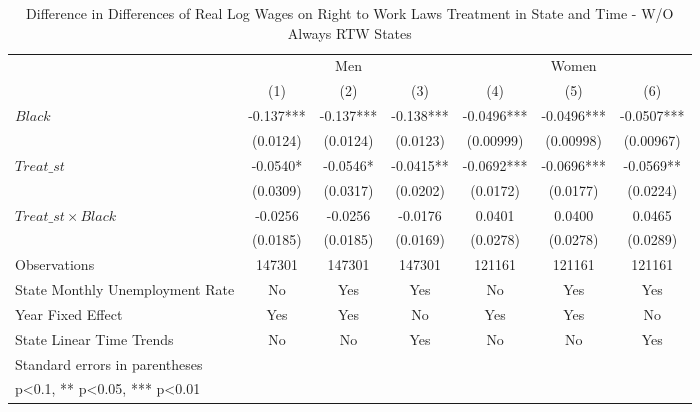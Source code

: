 \begin{table}[htbp]\centering
\def\sym#1{\ifmmode^{#1}\else\(^{#1}\)\fi}
\caption{Difference in Differences of Real Log Wages on Right to Work Laws Treatment in State and Time - W/O Always RTW States}
\begin{tabular}{l*{6}{c}}
\hline\hline
                    &\multicolumn{3}{c}{Men}                        &\multicolumn{3}{c}{Women}                      \\\cmidrule(lr){2-4}\cmidrule(lr){5-7}
                    &\multicolumn{1}{c}{(1)}   &\multicolumn{1}{c}{(2)}   &\multicolumn{1}{c}{(3)}   &\multicolumn{1}{c}{(4)}   &\multicolumn{1}{c}{(5)}   &\multicolumn{1}{c}{(6)}   \\
\hline
$ Black $           &      -0.137***&      -0.137***&      -0.138***&     -0.0496***&     -0.0496***&     -0.0507***\\
                    &    (0.0124)   &    (0.0124)   &    (0.0123)   &   (0.00999)   &   (0.00998)   &   (0.00967)   \\
[1em]
$ Treat\_{st} $      &     -0.0540*  &     -0.0546*  &     -0.0415** &     -0.0692***&     -0.0696***&     -0.0569** \\
                    &    (0.0309)   &    (0.0317)   &    (0.0202)   &    (0.0172)   &    (0.0177)   &    (0.0224)   \\
[1em]
$ Treat\_{st} \times Black $&     -0.0256   &     -0.0256   &     -0.0176   &      0.0401   &      0.0400   &      0.0465   \\
                    &    (0.0185)   &    (0.0185)   &    (0.0169)   &    (0.0278)   &    (0.0278)   &    (0.0289)   \\
\hline
Observations        &      147301   &      147301   &      147301   &      121161   &      121161   &      121161   \\
State Monthly Unemployment Rate&          No   &         Yes   &         Yes   &          No   &         Yes   &         Yes   \\
Year Fixed Effect   &         Yes   &         Yes   &          No   &         Yes   &         Yes   &          No   \\
State Linear Time Trends&          No   &          No   &         Yes   &          No   &          No   &         Yes   \\
\hline\hline
\multicolumn{7}{l}{\footnotesize Standard errors in parentheses}\\
\multicolumn{7}{l}{\footnotesize * p<0.1, ** p<0.05, *** p<0.01}\\
\end{tabular}
\end{table}
